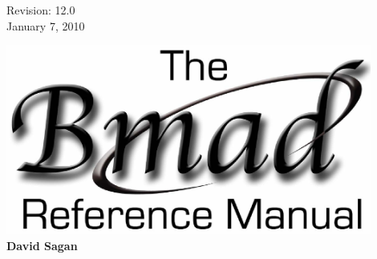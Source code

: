 \thispagestyle{empty}

\begin{flushright}
\large
  Revision: 12.0 \\
  January 7, 2010 \\
\end{flushright}

\vfill

{
\begin{center}
\includegraphics[width=12cm]{bmad-ref-manual.eps} \\
\vskip 0.3in
\huge\bf David Sagan
\end{center}
}

\vfill
\break

